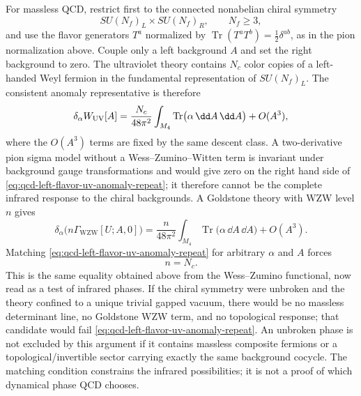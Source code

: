 For massless QCD, restrict first to the connected nonabelian chiral symmetry
\[
  SU(N_f)_L\times SU(N_f)_R ,
  \qquad N_f\ge3,
\]
and use the flavor generators \(T^a\) normalized by
\(\operatorname{Tr}(T^aT^b)=\frac12\delta^{ab}\), as in the pion
normalization above.  Couple only a left background \(A\) and set the right
background to zero.  The ultraviolet theory contains \(N_c\) color copies of a
left-handed Weyl fermion in the fundamental representation of
\(SU(N_f)_L\).  The consistent anomaly representative is therefore
\begin{equation}
  \delta_\alpha W_{\rm UV}[A]
  =
  \frac{N_c}{48\pi^2}
  \int_{M_4}
  \operatorname{Tr}\bigl(\alpha\,\dd A\,\dd A\bigr)
  +O(A^3),
  \label{eq:qcd-left-flavor-uv-anomaly-repeat}
\end{equation}
where the \(O(A^3)\) terms are fixed by the same descent class.  A
two-derivative pion sigma model without a Wess--Zumino--Witten term is
invariant under background gauge transformations and would give zero on the
right hand side of \eqref{eq:qcd-left-flavor-uv-anomaly-repeat}; it therefore
cannot be the complete infrared response to the chiral backgrounds.  A
Goldstone theory with WZW level \(n\) gives
\[
  \delta_\alpha\bigl(n\Gamma_{\mathrm{WZW}}[U;A,0]\bigr)
  =
  \frac{n}{48\pi^2}
  \int_{M_4}
  \operatorname{Tr}\bigl(\alpha\,\dd A\,\dd A\bigr)
  +O(A^3).
\]
Matching \eqref{eq:qcd-left-flavor-uv-anomaly-repeat} for arbitrary
\(\alpha\) and \(A\) forces
\begin{equation}
  n=N_c .
  \label{eq:wzw-level-forced-by-matching}
\end{equation}
This is the same equality obtained above from the Wess--Zumino functional, now
read as a test of infrared phases.  If the chiral symmetry were unbroken and
the theory confined to a unique trivial gapped vacuum, there would be no
massless determinant line, no Goldstone WZW term, and no topological response;
that candidate would fail \eqref{eq:qcd-left-flavor-uv-anomaly-repeat}.  An
unbroken phase is not excluded by this argument if it contains massless
composite fermions or a topological/invertible sector carrying exactly the same
background cocycle.  The matching condition constrains the infrared
possibilities; it is not a proof of which dynamical phase QCD chooses.


